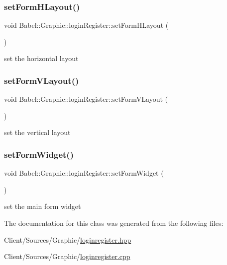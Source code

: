 \subsubsection{\texorpdfstring{set\+Form\+H\+Layout()}{setFormHLayout()}}
{\footnotesize\ttfamily void Babel\+::\+Graphic\+::login\+Register\+::set\+Form\+H\+Layout (\begin{DoxyParamCaption}{ }\end{DoxyParamCaption})}

set the horizontal layout \mbox{\label{classBabel_1_1Graphic_1_1loginRegister_abf1f55f98be322d5fb3e0748e641b126}} 
\subsubsection{\texorpdfstring{set\+Form\+V\+Layout()}{setFormVLayout()}}
{\footnotesize\ttfamily void Babel\+::\+Graphic\+::login\+Register\+::set\+Form\+V\+Layout (\begin{DoxyParamCaption}{ }\end{DoxyParamCaption})}

set the vertical layout \mbox{\label{classBabel_1_1Graphic_1_1loginRegister_af19fba33f4909f44f7f1aad884d8ba22}} 
\subsubsection{\texorpdfstring{set\+Form\+Widget()}{setFormWidget()}}
{\footnotesize\ttfamily void Babel\+::\+Graphic\+::login\+Register\+::set\+Form\+Widget (\begin{DoxyParamCaption}{ }\end{DoxyParamCaption})}

set the main form widget 

The documentation for this class was generated from the following files\+:\begin{DoxyCompactItemize}
\item 
Client/\+Sources/\+Graphic/\hyperlink{loginregister_8hpp}{loginregister.\+hpp}\item 
Client/\+Sources/\+Graphic/\hyperlink{loginregister_8cpp}{loginregister.\+cpp}\end{DoxyCompactItemize}
